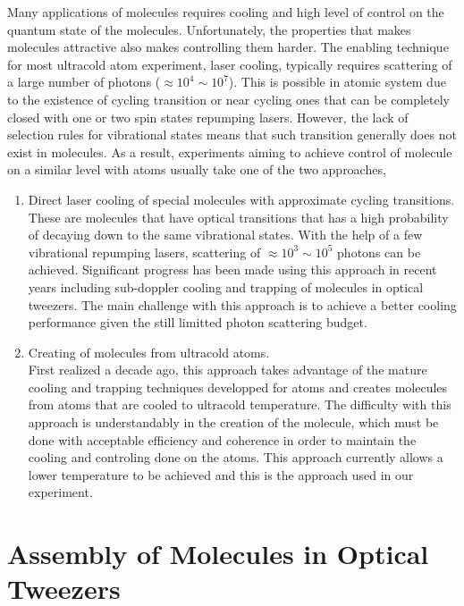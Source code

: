 Many applications of molecules requires cooling and high level of control
on the quantum state of the molecules.
Unfortunately, the properties that makes molecules attractive
also makes controlling them harder.
The enabling technique for most ultracold atom experiment, laser cooling,
typically requires scattering of a large number of photons ($\approx10^4\sim10^7$).
This is possible in atomic system due to the existence of cycling transition
or near cycling ones that can be completely closed with
one or two spin states repumping lasers.
However, the lack of selection rules for vibrational states means that
such transition generally does not exist in molecules.
As a result, experiments aiming to achieve control of molecule on a similar level with atoms
usually take one of the two approaches,
\begin{enumerate}
\item Direct laser cooling of special molecules
  with approximate cycling transitions.\\
  These are molecules that have optical transitions that has a high probability
  of decaying down to the same vibrational states.
  With the help of a few vibrational repumping lasers,
  scattering of $\approx10^3\sim10^5$ photons can be achieved.
  Significant progress has been made using this approach in recent years
  including sub-doppler cooling and trapping of molecules in optical tweezers.
  The main challenge with this approach is to achieve a better cooling performance
  given the still limitted photon scattering budget.
\item Creating of molecules from ultracold atoms.\\
  First realized a decade ago,
  this approach takes advantage of the mature cooling and trapping techniques
  developped for atoms and creates molecules from atoms
  that are cooled to ultracold temperature.
  The difficulty with this approach is understandably in the creation of the molecule,
  which must be done with acceptable efficiency and coherence
  in order to maintain the cooling and controling done on the atoms.
  This approach currently allows a lower temperature to be achieved
  and this is the approach used in our experiment.
\end{enumerate}

\section{Assembly of Molecules in Optical Tweezers}
\label{ch:introduction:tweezers}

